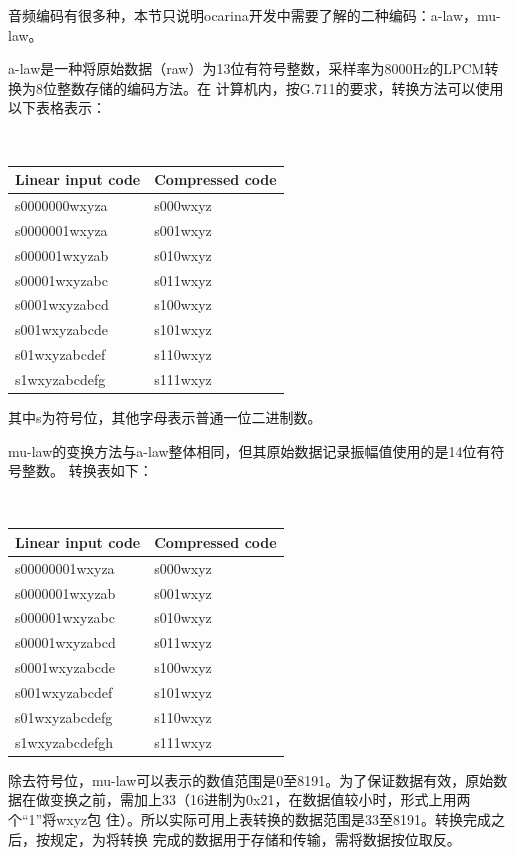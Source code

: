 \documentclass[11pt]{article}
\begin{document}
    音频编码有很多种，本节只说明ocarina开发中需要了解的二种编码：a-law，mu-law。

    a-law是一种将原始数据（raw）为13位有符号整数，采样率为8000Hz的LPCM转换为8位整数存储的编码方法。在
计算机内，按G.711的要求，转换方法可以使用以下表格表示：
 
\begin{table}[htbp]
{ \tt
\begin{tabular}{|l|l|}
\hline Linear input code &  Compressed code \\
\hline s0000000wxyza &  s000wxyz  \\ 
\hline s0000001wxyza &  s001wxyz  \\
\hline s000001wxyzab &  s010wxyz  \\
\hline s00001wxyzabc &  s011wxyz  \\
\hline s0001wxyzabcd &  s100wxyz  \\
\hline s001wxyzabcde &  s101wxyz  \\
\hline s01wxyzabcdef &  s110wxyz  \\
\hline s1wxyzabcdefg &  s111wxyz  \\
\hline
\end{tabular}
}
\end{table}


其中s为符号位，其他字母表示普通一位二进制数。

    mu-law的变换方法与a-law整体相同，但其原始数据记录振幅值使用的是14位有符号整数。
转换表如下：

\begin{table}[htbp]
{ \tt
\begin{tabular}{|l|l|}
\hline Linear input code  & Compressed code \\ 
\hline s00000001wxyza & s000wxyz \\
\hline s0000001wxyzab & s001wxyz \\
\hline s000001wxyzabc & s010wxyz \\
\hline s00001wxyzabcd & s011wxyz \\
\hline s0001wxyzabcde & s100wxyz \\
\hline s001wxyzabcdef & s101wxyz \\
\hline s01wxyzabcdefg & s110wxyz \\
\hline s1wxyzabcdefgh & s111wxyz \\
\hline
\end{tabular}

    除去符号位，mu-law可以表示的数值范围是0至8191。为了保证数据有效，原始数
据在做变换之前，需加上33（16进制为0x21，在数据值较小时，形式上用两个“1”将wxyz包
住）。所以实际可用上表转换的数据范围是33至8191。转换完成之后，按规定，为将转换
完成的数据用于存储和传输，需将数据按位取反。
}
\end{table}
    
\end{document}
